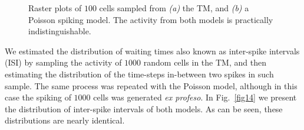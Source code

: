 \documentclass[11pt,letterpaper]{article}
\begin{document}
		    \begin{figure}[t]
			    \centering
			    \caption{
			        Raster plots of $100$ cells sampled from \emph{(a)} the TM, and
			        \emph{(b)} a Poisson spiking model.
			        The activity from both models is practically indistinguishable.
			    }
			    \label{fig13}
		    \end{figure}

			We estimated the distribution of waiting times also known as inter-spike intervals (ISI) by sampling
			the activity of $1000$ random cells in the TM, and then estimating the distribution of the time-steps
			in-between two spikes in such sample.
			The same process was repeated with the Poisson model, although in this case the spiking of $1000$ cells
			was generated \emph{ex profeso}.
            In Fig.~\ref{fig14} we present the distribution of inter-spike intervals of both models.
            As can be seen, these distributions are nearly identical.
\end{document}
